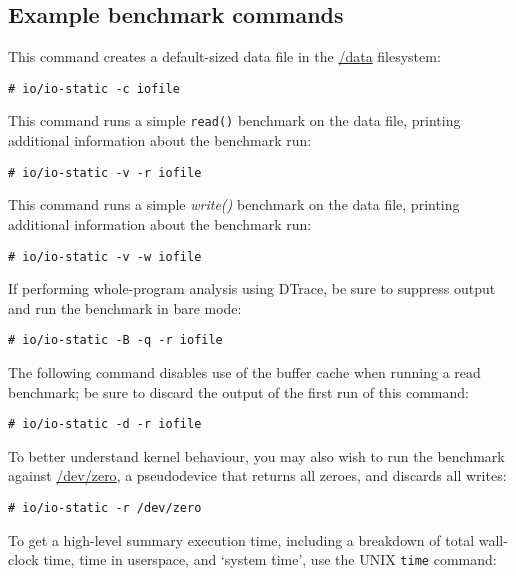 \documentclass[a4paper,10pt]{article}
\begin{document}
\subsection*{Example benchmark commands}

This command creates a default-sized data file in the \url{/data} filesystem:

\begin{verbatim}
# io/io-static -c iofile
\end{verbatim}

\noindent
This command runs a simple \texttt{read()} benchmark on the data file,
printing additional information about the benchmark run:

\begin{verbatim}
# io/io-static -v -r iofile
\end{verbatim}

\noindent
This command runs a simple \textit{write()} benchmark on the data file,
printing additional information about the benchmark run:

\begin{verbatim}
# io/io-static -v -w iofile
\end{verbatim}

\noindent
If performing whole-program analysis using DTrace, be sure to suppress output
and run the benchmark in bare mode:

\begin{verbatim}
# io/io-static -B -q -r iofile
\end{verbatim}

\noindent
The following command disables use of the buffer cache when running a read
benchmark; be sure to discard the output of the first run of this command:

\begin{verbatim}
# io/io-static -d -r iofile
\end{verbatim}

\noindent
To better understand kernel behaviour, you may also wish to run the benchmark
against \url{/dev/zero}, a pseudodevice that returns all zeroes, and discards
all writes:

\begin{verbatim}
# io/io-static -r /dev/zero
\end{verbatim}

\noindent
To get a high-level summary execution time, including a breakdown of total
wall-clock time, time in userspace, and `system time', use the UNIX
\texttt{time} command:
\end{document}
